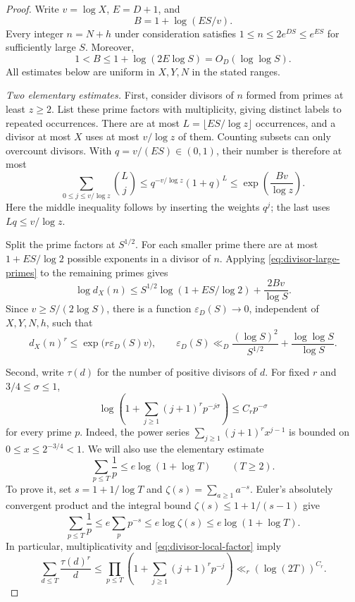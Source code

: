 \begin{proof}
Write \(v=\log X\), \(E=D+1\), and
\[
 B=1+\log(ES/v).
\]
Every integer \(n=N+h\) under consideration satisfies
\(1\le n\le2e^{DS}\le e^{ES}\) for sufficiently large \(S\).
Moreover,
\begin{equation}\label{eq:divisor-B}
 1<B\le1+\log(2E\log S)=O_D(\log\log S).
\end{equation}
All estimates below are uniform in \(X,Y,N\) in the stated ranges.

\smallskip
\noindent\emph{Two elementary estimates.}
First, consider divisors of \(n\) formed from primes at least \(z\ge2\).
List these prime factors with multiplicity, giving distinct labels to
repeated occurrences. There are at most
\(L=\lfloor ES/\log z\rfloor\) occurrences, and a divisor at most \(X\)
uses at most \(v/\log z\) of them. Counting subsets can only overcount
divisors. With \(q=v/(ES)\in(0,1)\), their number is therefore at most
\begin{equation}\label{eq:divisor-large-primes}
 \sum_{0\le j\le v/\log z}\binom Lj
 \le q^{-v/\log z}(1+q)^L
 \le \exp\left(\frac{Bv}{\log z}\right).
\end{equation}
Here the middle inequality follows by inserting the weights \(q^j\);
the last uses \(Lq\le v/\log z\).

Split the prime factors at \(S^{1/2}\).
For each smaller prime there are at most \(1+ES/\log2\) possible
exponents in a divisor of \(n\). Applying
\eqref{eq:divisor-large-primes} to the remaining primes gives
\[
 \log d_X(n)
 \le S^{1/2}\log(1+ES/\log2)+\frac{2Bv}{\log S}.
\]
Since \(v\ge S/(2\log S)\), there is a function
\(\varepsilon_D(S)\to0\), independent of \(X,Y,N,h\), such that
\begin{equation}\label{eq:divisor-pointwise}
 d_X(n)^r\le \exp\bigl(r\varepsilon_D(S)v\bigr),
 \qquad
 \varepsilon_D(S)\ll_D
 \frac{(\log S)^2}{S^{1/2}}+\frac{\log\log S}{\log S}.
\end{equation}

Second, write \(\tau(d)\) for the number of positive divisors of \(d\).
For fixed \(r\) and \(3/4\le\sigma\le1\),
\begin{equation}\label{eq:divisor-local-factor}
 \log\left(1+\sum_{j\ge1}(j+1)^r p^{-j\sigma}\right)
 \le C_r p^{-\sigma}
\end{equation}
for every prime \(p\).
Indeed, the power series
\(\sum_{j\ge1}(j+1)^r x^{j-1}\) is bounded on
\(0\le x\le2^{-3/4}<1\).
We will also use the elementary estimate
\begin{equation}\label{eq:prime-reciprocals}
 \sum_{p\le T}\frac1p\le e\log(1+\log T)\qquad(T\ge2).
\end{equation}
To prove it, set \(s=1+1/\log T\) and
\(\zeta(s)=\sum_{a\ge1}a^{-s}\).
Euler's absolutely convergent product and the integral bound
\(\zeta(s)\le1+1/(s-1)\) give
\[
 \sum_{p\le T}\frac1p
 \le e\sum_p p^{-s}
 \le e\log\zeta(s)
 \le e\log(1+\log T).
\]
In particular, multiplicativity and
\eqref{eq:divisor-local-factor} imply
\begin{equation}\label{eq:divisor-harmonic}
 \sum_{d\le T}\frac{\tau(d)^r}{d}
 \le \prod_{p\le T}
       \left(1+\sum_{j\ge1}(j+1)^r p^{-j}\right)
 \ll_r(\log(2T))^{C_r}.
\end{equation}


\end{proof}
